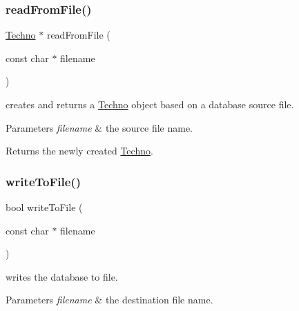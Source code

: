 \subsubsection{\texorpdfstring{read\+From\+File()}{readFromFile()}}
{\footnotesize\ttfamily \mbox{\hyperlink{class_d_t_r_1_1_techno}{Techno}} $\ast$ read\+From\+File (\begin{DoxyParamCaption}\item[{const char $\ast$}]{filename }\end{DoxyParamCaption})\hspace{0.3cm}{\ttfamily [static]}}



creates and returns a \mbox{\hyperlink{class_d_t_r_1_1_techno}{Techno}} object based on a database source file. 


\begin{DoxyParams}{Parameters}
{\em filename} & the source file name.\\
\hline
\end{DoxyParams}
\begin{DoxyReturn}{Returns}
the newly created \mbox{\hyperlink{class_d_t_r_1_1_techno}{Techno}}. 
\end{DoxyReturn}
\mbox{\label{class_d_t_r_1_1_techno_a26b05539dd3345963b8708788b82e2cb}} 
\subsubsection{\texorpdfstring{write\+To\+File()}{writeToFile()}}
{\footnotesize\ttfamily bool write\+To\+File (\begin{DoxyParamCaption}\item[{const char $\ast$}]{filename }\end{DoxyParamCaption})}



writes the database to file. 


\begin{DoxyParams}{Parameters}
{\em filename} & the destination file name. \\
\hline
\end{DoxyParams}
